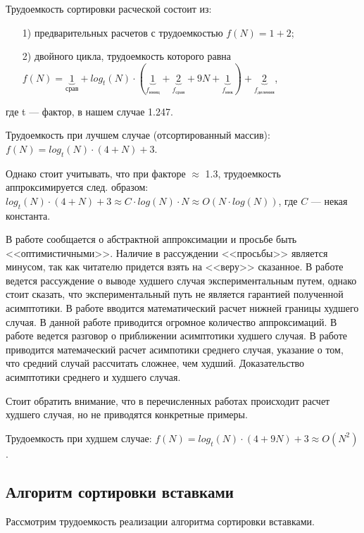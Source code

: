 Трудоемкость сортировки расческой состоит из:
\begin{enumerate}
	\item[1)] предварительных расчетов с трудоемкостью $f(N) = 1 + 2$;
	\item[2)] двойного цикла, трудоемкость которого равна 
	$f(N) = \underbrace{1}_{\text{срав}} + log_t(N) 
	\cdot 
	(\underbrace{1}_{f_\text{иниц}} + \underbrace{2}_{f_\text{срав}} + 9N + \underbrace{1}_{f_\text{инк}}) 
	+ \underbrace{2}_{f_\text{деления}}$,
\end{enumerate}
где t --- фактор, в нашем случае 1.247. 

Трудоемкость при лучшем случае (отсортированный массив): 
$f(N) = log_t(N) \cdot (4 + N) + 3$.

Однако стоит учитывать, что при факторе $\approx$ 1.3, трудоемкость аппроксимируется след. образом: 
$log_t(N) \cdot (4 + N) + 3 \approx C \cdot log(N) \cdot 
N \approx O(N \cdot log(N))$, где $C$ --- некая константа. 

В работе \cite{byte_ocr} сообщается о абстрактной аппроксимации и просьбе быть <<оптимистичными>>. 
Наличие в рассуждении <<просьбы>> является минусом, так как читателю придется взять на <<веру>> сказанное.
В работе \cite{comb_cocktail_counting_sort_compare} ведется рассуждение о выводе худшего случая экспериментальным
путем, однако стоит сказать, что экспериментальный путь не является гарантией полученной асимптотики.
В работе \cite{kolmogorov_complexity} вводится математический расчет нижней границы худшего случая. В данной 
работе приводится огромное количество аппроксимаций.
В работе \cite{simd} ведется разговор о приближении асимптотики худшего случая.
В работе \cite{dobosiewicz_shaker_sort} приводится матемаческий расчет асимпотики среднего случая, 
указание о том, что средний случай рассчитать сложнее, чем худший.
Доказательство асимптотики среднего и худшего случая.

Стоит обратить внимание, что в перечисленных работах происходит расчет худшего случая, но не приводятся конкретные примеры.

Трудоемкость при худшем случае: $f(N) =log_t(N) \cdot (4 + 9N) + 3 \approx O(N^2)$.

\subsection{Алгоритм сортировки вставками}

Рассмотрим трудоемкость реализации алгоритма сортировки вставками.

